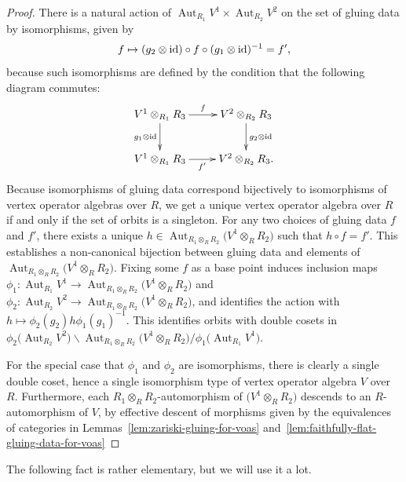 \documentclass[pdftex]{sigma}
\DeclareMathOperator{\Aut}{Aut}
\theoremstyle{definition}
\begin{document}
\begin{proof}There is a natural action of $\Aut_{R_1} V^1 \times \Aut_{R_2} V^2$ on the set of gluing data by isomorphisms, given by
\begin{gather*} f \mapsto (g_2 \otimes {\rm id}) \circ f \circ (g_1 \otimes {\rm id})^{-1} = f', \end{gather*}
because such isomorphisms are defined by the condition that the following diagram commutes:
\begin{gather*} \xymatrix{ V^1 \otimes_{R_1} R_3 \ar[r]^-{f} \ar[d]_{g_1 \otimes {\rm id}} & V^2 \otimes_{R_2} R_3 \ar[d]^{g_2 \otimes {\rm id}} \\ V^1 \otimes_{R_1} R_3 \ar[r]_-{f'} & V^2 \otimes_{R_2} R_3 . } \end{gather*}
Because isomorphisms of gluing data correspond bijectively to isomorphisms of vertex operator algebras over $R$, we get a unique vertex operator algebra over $R$ if and only if the set of orbits is a singleton. For any two choices of gluing data $f$ and $f'$, there exists a unique $h \in \Aut_{R_1 \otimes_{R} R_2} \big(V^1 \otimes_{R} R_2\big)$ such that $h \circ f = f'$. This establishes a non-canonical bijection between gluing data and elements of $\Aut_{R_1 \otimes_{R} R_2} \big(V^1 \otimes_{R} R_2\big)$. Fixing some $f$ as a base point induces inclusion maps $\phi_1\colon \Aut_{R_1} V^1 \to \Aut_{R_1 \otimes_{R} R_2} \big(V^1 \otimes_{R} R_2\big)$ and $\phi_2\colon \Aut_{R_2} V^2 \to \Aut_{R_1 \otimes_{R} R_2} \big(V^1 \otimes_{R} R_2\big)$, and identifies the action with $h \mapsto \phi_2(g_2) h \phi_1(g_1)^{-1}$. This identifies orbits with double cosets in $\phi_2\big(\Aut_{R_2} V^2\big) \backslash \Aut_{R_1 \otimes_{R} R_2}\big(V^1 \otimes_{R} R_2\big) / \phi_1\big(\Aut_{R_1} V^1\big)$.

For the special case that $\phi_1$ and $\phi_2$ are isomorphisms, there is clearly a single double coset, hence a single isomorphism type of vertex operator algebra $V$ over $R$. Furthermore, each $R_1 \otimes_{R} R_2$-automorphism of $\big(V^1 \otimes_{R} R_2\big)$ descends to an $R$-automorphism of $V$, by effective descent of morphisms given by the equivalences of categories in Lemmas~\ref{lem:zariski-gluing-for-voas} and~\ref{lem:faithfully-flat-gluing-data-for-voas}
\end{proof}

The following fact is rather elementary, but we will use it a lot.
\end{document}
